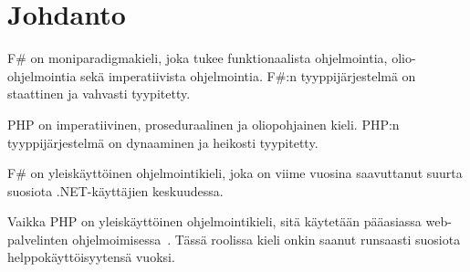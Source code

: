 \section{Johdanto}
F\# on moniparadigmakieli, joka tukee funktionaalista ohjelmointia, olio-ohjelmointia sekä imperatiivista ohjelmointia. F\#:n tyyppijärjestelmä on staattinen ja vahvasti tyypitetty. 
\par
PHP on imperatiivinen, proseduraalinen ja oliopohjainen kieli. PHP:n tyyppijärjestelmä on dynaaminen ja heikosti tyypitetty.
\par
F\# on yleiskäyttöinen ohjelmointikieli, joka on viime vuosina saavuttanut suurta suosiota .NET-käyttäjien keskuudessa.
\par
Vaikka PHP on yleiskäyttöinen ohjelmointikieli, sitä käytetään pääasiassa web-palvelinten ohjelmoimisessa~\cite{wiki_php}. Tässä roolissa kieli onkin saanut runsaasti suosiota helppokäyttöisyytensä vuoksi.